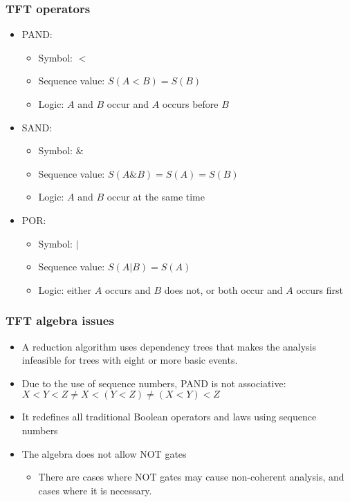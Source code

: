 \begin{frame}
\frametitle{TFT operators}

\begin{itemize}
  \item PAND: 
    \begin{itemize}
      \item Symbol: $<$
      \item Sequence value: $S(A<B) = S(B)$
      \item Logic: $A$ and $B$ occur and $A$ occurs before $B$
    \end{itemize}
  \item SAND: 
    \begin{itemize}
      \item Symbol: $\&$
      \item Sequence value: $S(A\&B) = S(A) = S(B)$
      \item Logic: $A$ and $B$ occur at the same time
    \end{itemize}
  \item POR: 
    \begin{itemize}
      \item Symbol: $|$
      \item Sequence value: $S(A|B) = S(A)$
      \item Logic: either $A$ occurs and $B$ does not, or both occur and $A$ occurs first
    \end{itemize}
\end{itemize}
\end{frame}

\begin{frame}
\frametitle{TFT algebra issues}

\begin{itemize}
  \item A reduction algorithm uses dependency trees that makes the analysis infeasible for trees with eight or more basic events.
  \item Due to the use of sequence numbers, PAND is not associative: $X<Y<Z \ne X<(Y<Z) \ne (X<Y)<Z$ 
  \item It redefines all traditional Boolean operators and laws using sequence numbers 
  \item The algebra does not allow NOT gates
    \begin{itemize}
      \item<2-> There are cases where NOT gates may cause non-coherent analysis, and cases where it is necessary.
    \end{itemize}
\end{itemize}
\end{frame}

